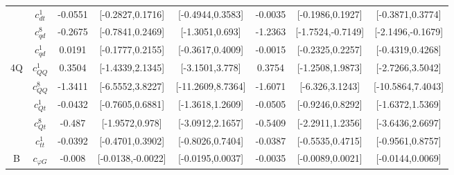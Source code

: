 \documentclass{article}
\begin{document}
\begin{table}[H]
\begin{tabular}{|c|c|c|c|c|c|c|c|}
 & $c_{dt}^{1}$ & -0.0551                             & [-0.2827,0.1716]                                 & [-0.4944,0.3583] & -0.0035                             & [-0.1986,0.1927]                                 & [-0.3871,0.3774] \\ \cline{2-8}
 & $c_{qd}^{8}$ & -0.2675                             & [-0.7841,0.2469]                                 & [-1.3051,0.693] & -1.2363                             & [-1.7524,-0.7149]                                 & [-2.1496,-0.1679] \\ \cline{2-8}
 & $c_{qd}^{1}$ & 0.0191                             & [-0.1777,0.2155]                                 & [-0.3617,0.4009] & -0.0015                             & [-0.2325,0.2257]                                 & [-0.4319,0.4268] \\ \cline{2-8}
\hline
\multirow{5}{*}{4Q}
 & $c_{QQ}^{1}$ & 0.3504                             & [-1.4339,2.1345]                                 & [-3.1501,3.778] & 0.3754                             & [-1.2508,1.9873]                                 & [-2.7266,3.5042] \\ \cline{2-8}
 & $c_{QQ}^{8}$ & -1.3411                             & [-6.5552,3.8227]                                 & [-11.2609,8.7364] & -1.6071                             & [-6.326,3.1243]                                 & [-10.5864,7.4043] \\ \cline{2-8}
 & $c_{Qt}^{1}$ & -0.0432                             & [-0.7605,0.6881]                                 & [-1.3618,1.2609] & -0.0505                             & [-0.9246,0.8292]                                 & [-1.6372,1.5369] \\ \cline{2-8}
 & $c_{Qt}^{8}$ & -0.487                             & [-1.9572,0.978]                                 & [-3.0912,2.1657] & -0.5409                             & [-2.2911,1.2356]                                 & [-3.6436,2.6697] \\ \cline{2-8}
 & $c_{tt}^{1}$ & -0.0392                             & [-0.4701,0.3902]                                 & [-0.8026,0.7404] & -0.0387                             & [-0.5535,0.4715]                                 & [-0.9561,0.8757] \\ \cline{2-8}
\hline
\multirow{7}{*}{B}
 & $c_{\varphi G}$ & -0.008                             & [-0.0138,-0.0022]                                 & [-0.0195,0.0037] & -0.0035                             & [-0.0089,0.0021]                                 & [-0.0144,0.0069] \\ \cline{2-8}

\end{tabular}
\end{table}
\end{document}
